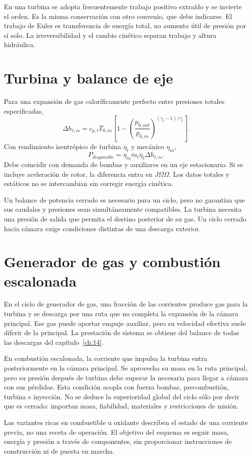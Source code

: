 En una turbina se adopta frecuentemente trabajo positivo extraído y se invierte el orden. Es la misma conservación con otro convenio, que debe indicarse. El trabajo de Euler es transferencia de energía total, no aumento útil de presión por sí solo. La irreversibilidad y el cambio cinético separan trabajo y altura hidráulica.
\section{Turbina y balance de eje}
Para una expansión de gas caloríficamente perfecto entre presiones totales especificadas,
\[
 \Delta h_{t,is}=c_{p,t}T_{0,in}
 \left[1-\left(\frac{p_{0,out}}{p_{0,in}}\right)^{(\gamma_t-1)/\gamma_t}\right].
\]
Con rendimiento isentrópico de turbina $\eta_t$ y mecánico $\eta_m$,
\[
 P_{disponible}=\eta_m\dot m_t\eta_t\Delta h_{t,is}.
\]
Debe coincidir con demanda de bombas y auxiliares en un eje estacionario. Si se incluye aceleración de rotor, la diferencia entra en $J\Omega\dot\Omega$. Los datos totales y estáticos no se intercambian sin corregir energía cinética.\cite{MIT27}

Un balance de potencia cerrado es necesario para un ciclo, pero no garantiza que sus caudales y presiones sean simultáneamente compatibles. La turbina necesita una presión de salida que permita el destino posterior de su gas. Un ciclo cerrado hacia cámara exige condiciones distintas de una descarga exterior.
\section{Generador de gas y combustión escalonada}
En el ciclo de generador de gas, una fracción de las corrientes produce gas para la turbina y se descarga por una ruta que no completa la expansión de la cámara principal. Ese gas puede aportar empuje auxiliar, pero su velocidad efectiva suele diferir de la principal. La prestación de sistema se obtiene del balance de todas las descargas del capítulo~\ref{ch:14}.

En combustión escalonada, la corriente que impulsa la turbina entra posteriormente en la cámara principal. Se aprovecha su masa en la ruta principal, pero su presión después de turbina debe superar la necesaria para llegar a cámara con sus pérdidas. Esta condición acopla con fuerza bombas, precombustión, turbina e inyección. No se deduce la superioridad global del ciclo sólo por decir que es cerrado: importan masa, fiabilidad, materiales y restricciones de misión.\cite{MIT25}

Las variantes ricas en combustible u oxidante describen el estado de una corriente previa, no una receta de operación. El objetivo del esquema es seguir masa, energía y presión a través de componentes, sin proporcionar instrucciones de construcción ni de puesta en marcha.
